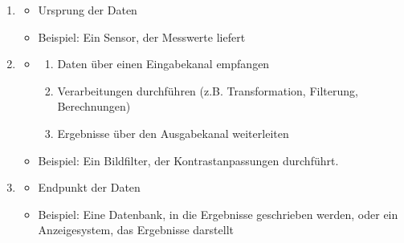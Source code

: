 \begin{infoBox}[title=Arten von Filtern]
    \begin{enumerate}
        \item {}
        \begin{itemize}
            \item Ursprung der Daten
            \item Beispiel: Ein Sensor, der Messwerte liefert
        \end{itemize}
        \item {}
        \begin{itemize}
            \item {}
            \begin{enumerate}
                \item Daten über einen Eingabekanal empfangen
                \item Verarbeitungen durchführen (z.B. Transformation, Filterung, Berechnungen)
                \item Ergebnisse über den Ausgabekanal weiterleiten
            \end{enumerate}
            \item Beispiel: Ein Bildfilter, der Kontrastanpassungen durchführt.
        \end{itemize}
        \item {}
        \begin{itemize}
            \item Endpunkt der Daten
            \item Beispiel: Eine Datenbank, in die Ergebnisse geschrieben werden, oder ein Anzeigesystem, das Ergebnisse darstellt
        \end{itemize}
    \end{enumerate}
\end{infoBox}
